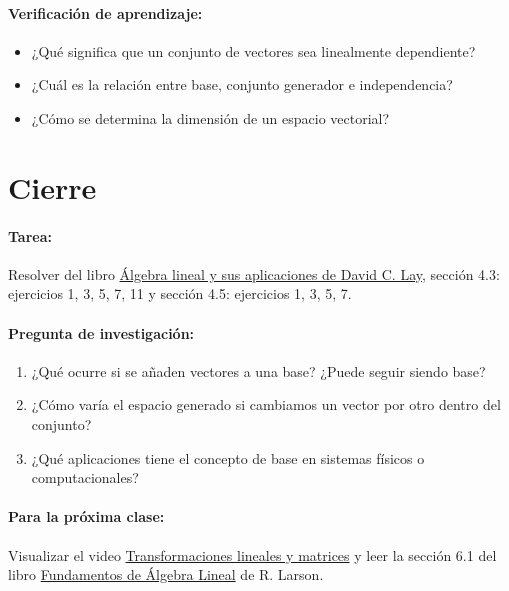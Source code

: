 \documentclass[a4,11pt]{aleph-notas}
\begin{document}
\paragraph{Verificación de aprendizaje:}  
\begin{itemize}[leftmargin=*]
    \item ¿Qué significa que un conjunto de vectores sea linealmente dependiente?
    \item ¿Cuál es la relación entre base, conjunto generador e independencia?
    \item ¿Cómo se determina la dimensión de un espacio vectorial?
\end{itemize}

\section*{Cierre}

\paragraph{Tarea:}  
Resolver del libro \href{https://catalogobiblioteca.puce.edu.ec/cgi-bin/koha/opac-detail.pl?biblionumber=86083}{Álgebra lineal y sus aplicaciones de David C. Lay}, sección 4.3: ejercicios 1, 3, 5, 7, 11 y sección 4.5: ejercicios 1, 3, 5, 7.

\paragraph{Pregunta de investigación:}  
\begin{enumerate}[leftmargin=*]
    \item ¿Qué ocurre si se añaden vectores a una base? ¿Puede seguir siendo base?
    \item ¿Cómo varía el espacio generado si cambiamos un vector por otro dentro del conjunto?
    \item ¿Qué aplicaciones tiene el concepto de base en sistemas físicos o computacionales?
\end{enumerate}

\paragraph{Para la próxima clase:}  
Visualizar el video \href{https://youtu.be/kYB8IZa5AuE?si=gbqAeTULCuLFypRi}{Transformaciones lineales y matrices} y leer la sección 6.1 del libro \href{https://catalogobiblioteca.puce.edu.ec/cgi-bin/koha/opac-detail.pl?biblionumber=86081&query_desc=kw%2Cwrdl%3A%20algebra%20larson}{Fundamentos de Álgebra Lineal} de R. Larson.
\end{document}
